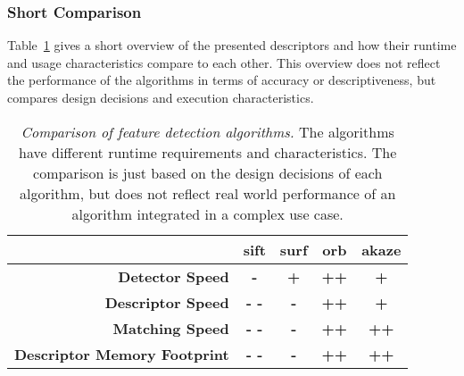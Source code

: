 \subsubsection{Short Comparison}

Table~\ref{tab:detector_comparison} gives a short overview of the presented descriptors and how their runtime and usage characteristics compare to each other.
This overview does not reflect the performance of the algorithms in terms of accuracy or descriptiveness, but compares design decisions and execution characteristics.
\begin{table}[H]
    {\renewcommand{\arraystretch}{1.3}%
    \setlength{\tabcolsep}{0.3em}%
    \begin{tabular}{rcccc}
    \toprule
    \null & \textbf{\acrshort{sift}} & \textbf{\acrshort{surf}} & \textbf{\acrshort{orb}} & \textbf{\acrshort{akaze}} \\
    \midrule
    \textbf{Detector Speed} & \textbf{-} & \textbf{+} & \textbf{++} & \textbf{+} \\
    \textbf{Descriptor Speed} & \textbf{- -} & \textbf{-} & \textbf{++} & \textbf{+} \\
    \textbf{Matching Speed} & \textbf{- -} & \textbf{-} & \textbf{++} & \textbf{++} \\
    \textbf{Descriptor Memory Footprint} & \textbf{- -} & \textbf{-} & \textbf{++} & \textbf{++} \\
    \bottomrule
    \end{tabular}
    }
    \caption[Comparison of feature detection algorithms]{\emph{Comparison of feature detection algorithms.} The algorithms have different runtime requirements and characteristics. The comparison is just based on the design decisions of each algorithm, but does not reflect real world performance of an algorithm integrated in a complex use case.}\label{tab:detector_comparison}
\end{table}
